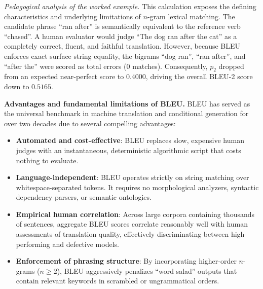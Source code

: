 \documentclass[../../main.tex]{subfiles}
\begin{document}
\textit{Pedagogical analysis of the worked example.}
This calculation exposes the defining characteristics and underlying limitations of $n$-gram lexical matching. The candidate phrase ``ran after'' is semantically equivalent to the reference verb ``chased''. A human evaluator would judge ``The dog ran after the cat'' as a completely correct, fluent, and faithful translation. However, because BLEU enforces exact surface string equality, the bigrams ``dog ran'', ``ran after'', and ``after the'' were scored as total errors ($0$ matches). Consequently, $p_2$ dropped from an expected near-perfect score to $0.4000$, driving the overall BLEU-2 score down to $0.5165$.

\noindent\textbf{Advantages and fundamental limitations of BLEU.}\newline
BLEU has served as the universal benchmark in machine translation and conditional generation for over two decades due to several compelling advantages:
\begin{itemize}
    \item \textbf{Automated and cost-effective}: BLEU replaces slow, expensive human judges with an instantaneous, deterministic algorithmic script that costs nothing to evaluate.
    \item \textbf{Language-independent}: BLEU operates strictly on string matching over whitespace-separated tokens. It requires no morphological analyzers, syntactic dependency parsers, or semantic ontologies.
    \item \textbf{Empirical human correlation}: Across large corpora containing thousands of sentences, aggregate BLEU scores correlate reasonably well with human assessments of translation quality, effectively discriminating between high-performing and defective models.
    \item \textbf{Enforcement of phrasing structure}: By incorporating higher-order $n$-grams ($n \ge 2$), BLEU aggressively penalizes ``word salad'' outputs that contain relevant keywords in scrambled or ungrammatical orders.
\end{itemize}
\end{document}
